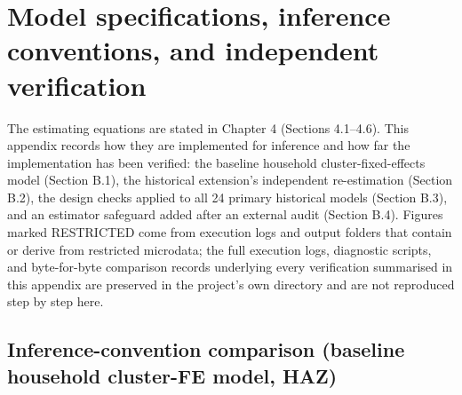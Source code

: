 
\section{Model specifications, inference conventions, and independent verification}\label{sec:B}

The estimating equations are stated in Chapter 4 (Sections 4.1--4.6). This appendix records how they are implemented for inference and how far the implementation has been verified: the baseline household cluster-fixed-effects model (Section B.1), the historical extension's independent re-estimation (Section B.2), the design checks applied to all 24 primary historical models (Section B.3), and an estimator safeguard added after an external audit (Section B.4). Figures marked RESTRICTED come from execution logs and output folders that contain or derive from restricted microdata; the full execution logs, diagnostic scripts, and byte-for-byte comparison records underlying every verification summarised in this appendix are preserved in the project's own  directory and are not reproduced step by step here.

\subsection{Inference-convention comparison (baseline household cluster-FE model, HAZ)}\label{sec:B.1}


